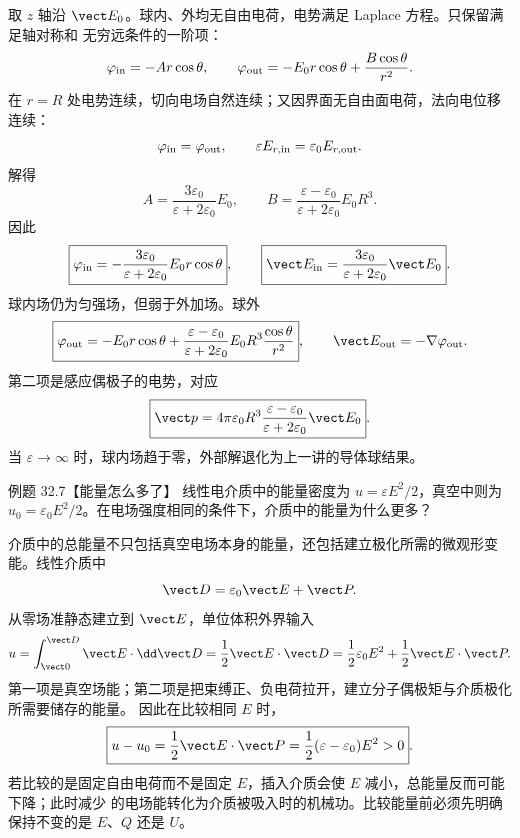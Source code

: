\begin{xesolution}
取 $z$ 轴沿 $\vect E_0$。球内、外均无自由电荷，电势满足 Laplace 方程。只保留满足轴对称和
无穷远条件的一阶项：
\[
  \varphi_{\rm in}=-Ar\cos\theta,
  \qquad
  \varphi_{\rm out}=-E_0r\cos\theta+\frac{B\cos\theta}{r^2}.
\]
在 $r=R$ 处电势连续，切向电场自然连续；又因界面无自由面电荷，法向电位移连续：
\[
  \varphi_{\rm in}=\varphi_{\rm out},
  \qquad
  \varepsilon E_{r,\rm in}=\varepsilon_0E_{r,\rm out}.
\]
解得
\[
  A=\frac{3\varepsilon_0}{\varepsilon+2\varepsilon_0}E_0,
  \qquad
  B=\frac{\varepsilon-\varepsilon_0}{\varepsilon+2\varepsilon_0}E_0R^3.
\]
因此
\begin{equation}
  \boxed{\varphi_{\rm in}=-\frac{3\varepsilon_0}{\varepsilon+2\varepsilon_0}
  E_0r\cos\theta},
  \qquad
  \boxed{\vect E_{\rm in}=\frac{3\varepsilon_0}{\varepsilon+2\varepsilon_0}\vect E_0}.
\end{equation}
球内场仍为匀强场，但弱于外加场。球外
\begin{equation}
  \boxed{\varphi_{\rm out}=-E_0r\cos\theta
  +\frac{\varepsilon-\varepsilon_0}{\varepsilon+2\varepsilon_0}
  E_0R^3\frac{\cos\theta}{r^2}},
  \qquad \vect E_{\rm out}=-\nabla\varphi_{\rm out}.
\end{equation}
第二项是感应偶极子的电势，对应
\begin{equation}
  \boxed{\vect p=4\pi\varepsilon_0R^3
  \frac{\varepsilon-\varepsilon_0}{\varepsilon+2\varepsilon_0}\vect E_0}.
\end{equation}
当 $\varepsilon\to\infty$ 时，球内场趋于零，外部解退化为上一讲的导体球结果。

\dielectricSphereDiagram
\end{xesolution}

\Needspace{0.34\textheight}
\begin{origexamplebox}{例题 32.7【能量怎么多了】}
线性电介质中的能量密度为 $u=\varepsilon E^2/2$，真空中则为
$u_0=\varepsilon_0E^2/2$。在电场强度相同的条件下，介质中的能量为什么更多？
\end{origexamplebox}

\begin{xesolution}
介质中的总能量不只包括真空电场本身的能量，还包括建立极化所需的微观形变能。线性介质中
\[
  \vect D=\varepsilon_0\vect E+\vect P.
\]
从零场准静态建立到 $\vect E$，单位体积外界输入
\[
  u=\int_{\vect 0}^{\vect D}\vect E\cdot\dd\vect D
  =\frac12\vect E\cdot\vect D
  =\frac12\varepsilon_0E^2+\frac12\vect E\cdot\vect P.
\]
第一项是真空场能；第二项是把束缚正、负电荷拉开，建立分子偶极矩与介质极化所需要储存的能量。
因此在比较相同 $E$ 时，
\begin{equation}
  \boxed{u-u_0=\frac12\vect E\cdot\vect P
  =\frac12(\varepsilon-\varepsilon_0)E^2>0}.
\end{equation}
若比较的是固定自由电荷而不是固定 $E$，插入介质会使 $E$ 减小，总能量反而可能下降；此时减少
的电场能转化为介质被吸入时的机械功。比较能量前必须先明确保持不变的是 $E$、$Q$ 还是 $U$。
\end{xesolution}

